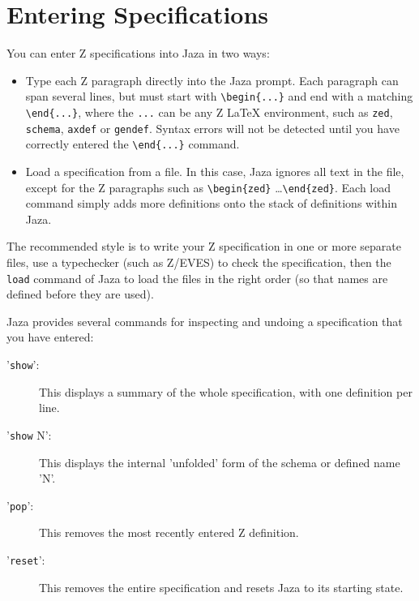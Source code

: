 \documentclass[11pt]{article}
\newcommand{\Jaza}{Jaza}
\begin{document}
\section{Entering Specifications}
\label{sec:enter}

You can enter Z specifications into {\Jaza} in two ways:
\begin{itemize}
\item Type each Z paragraph directly into the {\Jaza} prompt.
  Each paragraph can span several lines, but must start 
  with \verb!\begin{...}! and end with a matching \verb!\end{...}!,
  where the \verb!...! can be any Z LaTeX environment, such as 
  \verb!zed!, \verb!schema!, \verb!axdef! or \verb!gendef!. 
  Syntax errors will not be detected until you have correctly
  entered the \verb!\end{...}! command.
  
\item Load a specification from a file.  In this case, {\Jaza}
  ignores all text in the file, except for the Z paragraphs
  such as \verb!\begin{zed}! \ldots \verb!\end{zed}!.
  Each load command simply adds more definitions onto the stack
  of definitions within {\Jaza}.
\end{itemize}

The recommended style is to write your Z specification in one or
more separate files, use a typechecker (such as Z/EVES) to check
the specification, then the \verb!load! command of {\Jaza} to load
the files in the right order (so that names are defined before they
are used).

{\Jaza} provides several commands for inspecting and undoing a
specification that you have entered:
\begin{description}
\item['\texttt{show}':] This displays a summary of the whole
  specification, with one definition per line.
\item['\texttt{show} N':] This displays the internal 'unfolded'
  form of the schema or defined name 'N'.
\item['\texttt{pop}':] This removes the most recently entered 
  Z definition.
\item['\texttt{reset}':] This removes the entire specification
  and resets {\Jaza} to its starting state.
\end{description}
\end{document}
